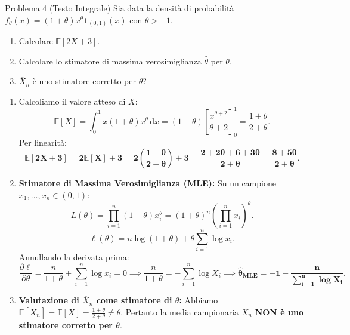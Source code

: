 \documentclass[11pt,a4paper]{article}
\newcommand{\EE}{\mathbb{E}}
\newcommand{\dx}{\mathrm{d}x}
\begin{document}
\begin{problemabox}{Problema 4 (Testo Integrale)}
Sia data la densità di probabilità $f_\theta(x) = (1+\theta)x^\theta \mathbf{1}_{(0,1)}(x)$ con $\theta > -1$.
\begin{enumerate}[label=(\alph*)]
    \item Calcolare $\EE[2X+3]$.
    \item Calcolare lo stimatore di massima verosimiglianza $\widehat{\theta}$ per $\theta$.
    \item $\overline{X}_n$ è uno stimatore corretto per $\theta$?
\end{enumerate}
\end{problemabox}

\begin{soluzionebox}
\begin{enumerate}[label=(\alph*)]
    \item Calcoliamo il valore atteso di $X$:
    \[
    \EE[X] = \int_0^1 x (1+\theta) x^\theta \, \dx = (1+\theta) \left[ \frac{x^{\theta+2}}{\theta+2} \right]_0^1 = \frac{1+\theta}{2+\theta}.
    \]
    Per linearità:
    \[
    \mathbf{\EE[2X+3] = 2\EE[X] + 3 = 2\left(\frac{1+\theta}{2+\theta}\right) + 3 = \frac{2 + 2\theta + 6 + 3\theta}{2+\theta} = \frac{8+5\theta}{2+\theta}}.
    \]

    \item \textbf{Stimatore di Massima Verosimiglianza (MLE):}
    Su un campione $x_1, \dots, x_n \in (0, 1)$:
    \[
    L(\theta) = \prod_{i=1}^n (1+\theta) x_i^\theta = (1+\theta)^n \left( \prod_{i=1}^n x_i \right)^\theta.
    \]
    \[
    \ell(\theta) = n \log(1+\theta) + \theta \sum_{i=1}^n \log x_i.
    \]
    Annullando la derivata prima:
    \[
    \frac{\partial \ell}{\partial \theta} = \frac{n}{1+\theta} + \sum_{i=1}^n \log x_i = 0 \implies \frac{n}{1+\theta} = -\sum_{i=1}^n \log X_i \implies \mathbf{\widehat{\theta}_{\text{MLE}} = -1 - \frac{n}{\sum_{i=1}^n \log X_i}}.
    \]

    \item \textbf{Valutazione di $\overline{X}_n$ come stimatore di $\theta$:}
    Abbiamo $\EE[\overline{X}_n] = \EE[X] = \frac{1+\theta}{2+\theta} \neq \theta$.
    Pertanto la media campionaria $\overline{X}_n$ \textbf{NON è uno stimatore corretto per $\theta$}.
\end{enumerate}
\end{soluzionebox}
\end{document}
